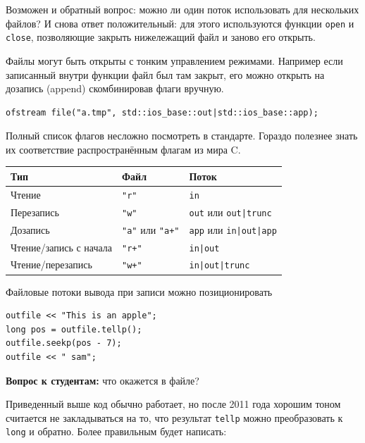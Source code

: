 \documentclass[a4paper,12pt,oneside]{article}
\newif\ifanswers
\begin{document}
Возможен и обратный вопрос: можно ли один поток использовать для нескольких файлов? И снова ответ положительный: для этого используются функции \lstinline!open! и \lstinline!close!, позволяющие закрыть нижележащий файл и заново его открыть.

Файлы могут быть открыты с тонким управлением режимами. Например если записанный внутри функции файл был там закрыт, его можно открыть на дозапись (append) скомбинировав флаги вручную.

\begin{lstlisting}
ofstream file("a.tmp", std::ios_base::out|std::ios_base::app);
\end{lstlisting}

Полный список флагов несложно посмотреть в стандарте. Гораздо полезнее знать их соответствие распространённым флагам из мира C.

\begin{center}
\begin{tabular}{ | l | l | l | }
  \hline
  Тип & Файл & Поток \\ \hline
  Чтение & \lstinline!"r"! & \lstinline!in! \\
  Перезапись & \lstinline!"w"! & \lstinline!out! или \lstinline!out|trunc! \\
  Дозапись & \lstinline!"a"! или \lstinline!"a+"! & \lstinline!app! или \lstinline!in|out|app! \\
  Чтение/запись с начала & \lstinline!"r+"! & \lstinline!in|out! \\
  Чтение/перезапись & \lstinline!"w+"! & \lstinline!in|out|trunc! \\
  \hline
\end{tabular}
\end{center}

Файловые потоки вывода при записи можно позиционировать

\begin{lstlisting}
outfile << "This is an apple";
long pos = outfile.tellp();
outfile.seekp(pos - 7);
outfile << " sam";
\end{lstlisting}

\textbf{Вопрос к студентам:} что окажется в файле?

\ifanswers
Правильный ответ: this is a sample
\fi

Приведенный выше код обычно работает, но после 2011 года хорошим тоном считается не закладываться на то, что результат \lstinline!tellp! можно преобразовать к \lstinline!long! и обратно. Более правильным будет написать:
\end{document}

